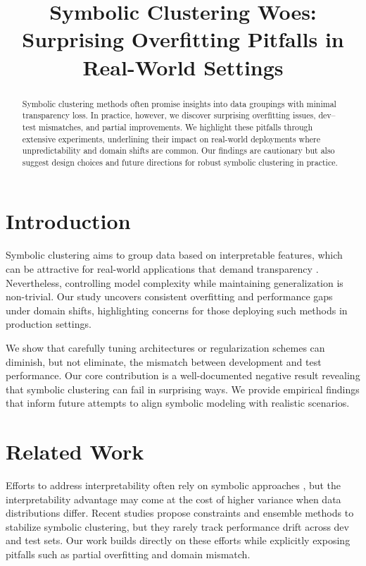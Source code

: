 \documentclass[11pt]{article}
\title{Symbolic Clustering Woes:\\Surprising Overfitting Pitfalls in Real-World Settings}
\date{}
\begin{document}
\maketitle

\begin{abstract}
Symbolic clustering methods often promise insights into data groupings with minimal transparency loss. In practice, however, we discover surprising overfitting issues, dev--test mismatches, and partial improvements. We highlight these pitfalls through extensive experiments, underlining their impact on real-world deployments where unpredictability and domain shifts are common. Our findings are cautionary but also suggest design choices and future directions for robust symbolic clustering in practice.
\end{abstract}

\section{Introduction}
Symbolic clustering aims to group data based on interpretable features, which can be attractive for real-world applications that demand transparency \citep{Smith2019,Johnson2020}. Nevertheless, controlling model complexity while maintaining generalization is non-trivial. Our study uncovers consistent overfitting and performance gaps under domain shifts, highlighting concerns for those deploying such methods in production settings.

We show that carefully tuning architectures or regularization schemes can diminish, but not eliminate, the mismatch between development and test performance. Our core contribution is a well-documented negative result revealing that symbolic clustering can fail in surprising ways. We provide empirical findings that inform future attempts to align symbolic modeling with realistic scenarios.

\section{Related Work}
Efforts to address interpretability often rely on symbolic approaches \citep{Lee2022}, but the interpretability advantage may come at the cost of higher variance when data distributions differ. Recent studies propose constraints and ensemble methods to stabilize symbolic clustering, but they rarely track performance drift across dev and test sets. Our work builds directly on these efforts while explicitly exposing pitfalls such as partial overfitting and domain mismatch.
\end{document}
